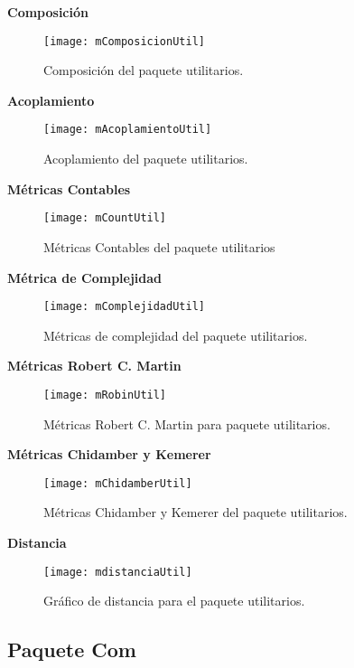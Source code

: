 \textbf{Composición}
\begin{figure}[H]
	\centering
	\texttt{[image: mComposicionUtil]}
	\centering
	\caption{Composición del paquete utilitarios.}
	\label{fig:mComposicionUtil}
\end{figure}
\textbf{Acoplamiento}
\begin{figure}[H]
	\centering
	\texttt{[image: mAcoplamientoUtil]}
	\centering
	\caption{Acoplamiento del paquete utilitarios.}
	\label{fig:mAcoplamientoUtil}
\end{figure}
\textbf{Métricas Contables}
\begin{figure}[H]
	\centering
	\texttt{[image: mCountUtil]}
	\centering
	\caption{Métricas Contables del paquete utilitarios}
	\label{fig:mCountApi}
\end{figure}
\textbf{Métrica de Complejidad}
\begin{figure}[H]
	\centering
	\texttt{[image: mComplejidadUtil]}
	\centering
	\caption{Métricas de complejidad del paquete utilitarios.}
	\label{fig:mComplejidadApi}
\end{figure}

\textbf{Métricas Robert C. Martin}
\begin{figure}[H]
	\centering
	\texttt{[image: mRobinUtil]}
	\centering
	\caption{Métricas Robert C. Martin para paquete utilitarios.}
	\label{fig:mRobinUtil}
\end{figure}
\clearpage
\textbf{Métricas Chidamber y Kemerer}
\begin{figure}[H]
	\centering
	\texttt{[image: mChidamberUtil]}
	\centering
	\caption{Métricas Chidamber y Kemerer del paquete utilitarios.}
	\label{fig:mChidamberUtil}
\end{figure}
\textbf{Distancia}
\begin{figure}[H]
	\centering
	\texttt{[image: mdistanciaUtil]}
	\centering
	\caption{Gráfico de distancia para el paquete utilitarios.}
	\label{fig:mdistanciaUtil}
\end{figure}

\newpage
\subsection{Paquete Com}

